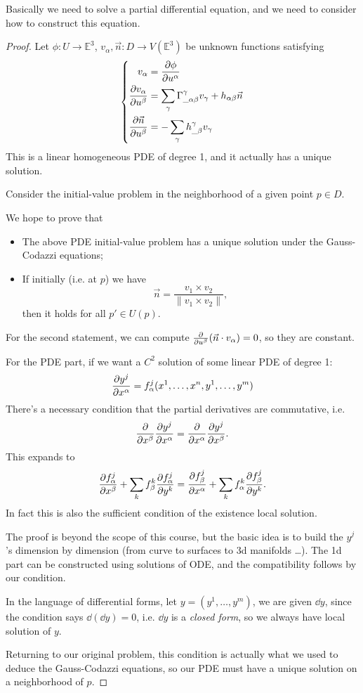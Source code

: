 Basically we need to solve a partial differential equation,
and we need to consider how to construct this equation.

\begin{proof}[Proof]
    Let $\phi: U\to \mathbb{E}^3$,
	$v_\alpha, \vec{n}: D\to V(\mathbb{E}^3)$ be unknown functions
	satisfying
	\[
	\left\{
	\begin{aligned}
		v_\alpha &= \frac{\partial \phi}{\partial u^\alpha}\\
		\frac{\partial v_\alpha}{\partial u^\beta} &=
		\sum_\gamma \Gamma_{\_\alpha\beta}^\gamma v_\gamma
		+ h_{\alpha\beta}\vec{n}\\
		\frac{\partial \vec{n}}{\partial u^\beta} &=
		- \sum_\gamma h_{\_\beta}^\gamma v_\gamma
	\end{aligned}\right.
	\]
	This is a linear homogeneous PDE of degree 1, and
	it actually has a unique solution.

	Consider the initial-value problem in the neighborhood of
	a given point $p\in D$.

	We hope to prove that
	\begin{itemize}
		\item The above PDE initial-value problem has a unique
			solution under the Gauss-Codazzi equations;
		\item If initially (i.e. at $p$) we have
			\[
			\vec{n} = \frac{v_1\times v_2}{\lVert v_1\times v_2 \rVert},
			\]
			then it holds for all $p'\in U(p)$.
	\end{itemize}

	For the second statement, we can compute
	$\frac{\partial }{\partial u^\beta}(\vec{n}\cdot v_\alpha) = 0$,
	so they are constant.

	For the PDE part, if we want a $C^2$ solution of some linear PDE of degree 1:
	\[
		\frac{\partial y^j}{\partial x^\alpha} = f_\alpha^j(x^1,\dots,x^n,y^1,\dots,y^m)
	\]
	There's a necessary condition that the partial derivatives are commutative,
	i.e.
	\[
	\frac{\partial }{\partial x^\beta}\frac{\partial y^j}{\partial x^\alpha} = \frac{\partial }{\partial x^\alpha}\frac{\partial y^j}{\partial x^\beta}.
	\]
	This expands to
	\[
	\frac{\partial f_\alpha^j}{\partial x^\beta} + \sum_{k} f_\beta^k\frac{\partial f_\alpha^j}{\partial y^k}
	= \frac{\partial f_\beta^j}{\partial x^\alpha} + \sum_{k} f_\alpha^k\frac{\partial f_\beta^j}{\partial y^k}.
	\]
	In fact this is also the sufficient condition of the existence local solution.
	\begin{remark}
		The proof is beyond the scope of this course,
		but the basic idea is to build the $y^j$'s
		dimension by dimension (from curve to surfaces to 3d manifolds \dots).
		The 1d part can be constructed using solutions of ODE,
		and the compatibility follows by our condition.

		In the language of differential forms,
		let $y = (y^1,\dots,y^m)$, we are given $\dd y$,
		since the condition says $\dd(\dd y) = 0$, i.e. $\dd y$ is
		a \textit{closed form}, so we always have local solution of $y$.
	\end{remark}

	Returning to our original problem, this condition is actually
	what we used to deduce the Gauss-Codazzi equations,
	so our PDE must have a unique solution on a neighborhood of $p$.
\end{proof}
